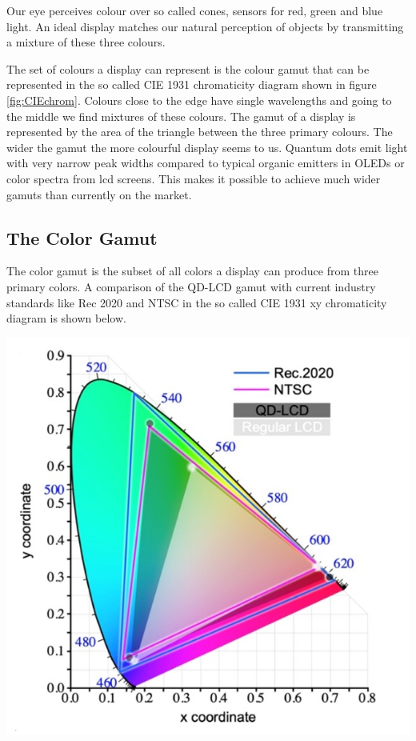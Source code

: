 \documentclass[11pt,a4paper]{article} %
\begin{document}
\begin{multicols}{2}
    Our eye perceives colour over so called cones, sensors for red, green and
    blue light. An ideal display matches our natural perception of objects by
    transmitting a mixture of these three colours. 
    
    The set of colours a display
    can
    represent is the colour gamut that can be represented in the so called CIE
    1931
    chromaticity diagram shown in figure \ref{fig:CIEchrom}. Colours close to the edge have
    single wavelengths and going to the middle we find mixtures of these
    colours.
    The gamut of a display is represented by the area of the triangle between
    the
    three primary colours. The wider the gamut the more
    colourful
    display seems to us.
    Quantum dots emit light with very narrow peak widths compared to typical
    organic emitters in OLEDs or color spectra from lcd screens. This makes it
    possible to achieve much wider gamuts than currently on the market.

    
    \begin{tcolorbox}[colback=red!5!white,colframe=red!75!black]
        \subsection*{The Color Gamut}
        The color gamut is the subset of all colors a display can
        produce from three primary colors. A comparison of the 
        QD-LCD gamut with current industry standards like Rec 2020
        and NTSC in the so called CIE 1931 xy chromaticity diagram is 
        shown below.
        \begin{center}
            \vspace{10pt}
            \includegraphics[width=0.8\linewidth]{ColorGamut2.jpg}
            \label{fig:CIEchrom}
            \vspace{10pt}
        \end{center}
    \end{tcolorbox}


\end{multicols}
\end{document}
